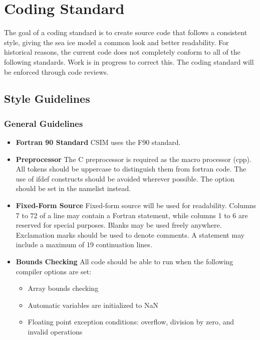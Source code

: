 
\section{Coding Standard}

The goal of a coding standard is to create source code that follows
a consistent style, giving the sea ice model a common look and better
readability.  For historical reasons, the current code does not
completely conform to all of the following standards.  Work is in 
progress to correct this. The coding standard will be enforced through
code reviews.

\subsection{Style Guidelines}

\subsubsection*{General Guidelines}

\begin{itemize}

\item {\bf Fortran 90 Standard} CSIM uses the F90 standard.

\item {\bf Preprocessor} The C preprocessor is required as the macro
                         processor (cpp).  All tokens should be
                         uppercase to distinguish them from fortran code.
                         The use of ifdef constructs should be avoided
                         wherever possible.  The option should be set in
                         the namelist instead.

\item {\bf Fixed-Form Source} Fixed-form source will be used for readability.
       Columns 7 to 72 of a line may contain a Fortran statement, while columns
       1 to 6 are reserved for special purposes.  Blanks may be used freely
       anywhere.  Exclamation marks should be used to denote comments.
       A statement may include a maximum of 19 continuation lines. 

\item {\bf Bounds Checking} All code should be able to run when the following
      compiler options are set:
      \begin{itemize}
        \item Array bounds checking
        \item Automatic variables are initialized to NaN
        \item Floating point exception conditions: overflow, division by zero, and
              invalid operations 
      \end{itemize}

\end{itemize}

